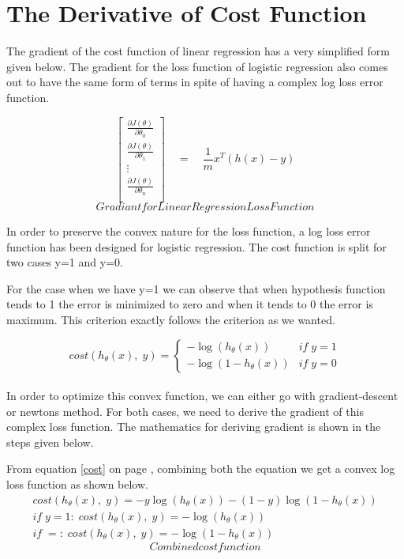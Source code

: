 \documentclass[10pt,a4paper]{article}
\begin{document}
\section{The Derivative of Cost Function}

The gradient of the cost function of linear regression has a very simplified form given below. The gradient for the loss function of logistic regression also comes out to have the same form of terms in spite of having a complex log loss error function.

$$
\begin{bmatrix} 
	\frac{\partial J(\theta)}{\partial\theta_0} \\
	\frac{\partial J(\theta)}{\partial\theta_1} \\
	\vdots \\
	\frac{\partial J(\theta)}{\partial\theta_n}\\
	\end{bmatrix}
	\quad 
	= \quad \frac{1}{m} x^T(h(x)-y)
$$
$$Gradiant for Linear Regression Loss Function$$ 


In order to preserve the convex nature for the loss function, a log loss error function has been designed for logistic regression. The cost function is split for two cases y=1 and y=0.

For the case when we have y=1 we can observe that when hypothesis function tends to 1 the error is minimized to zero and when it tends to 0 the error is maximum. This criterion exactly follows the criterion as we wanted.	
	
\begin{equation}
  cost(h_\theta(x),\; y) =
    \begin{cases}
      - \log(h_\theta(x)) & if \; y=1\\
      - \log(1 - h_\theta(x)) & if \; y=0
    \end{cases} 
  \label{cost}      
\end{equation}
\\
In order to optimize this convex function, we can either go with gradient-descent or newtons method. For both cases, we need to derive the gradient of this complex loss function. The mathematics for deriving gradient is shown in the steps given below.

From equation \eqref{cost} on page \pageref{cost}, combining both the equation we get a convex log loss function as shown below.
\begin{equation*}
\begin{array}{l}
	cost(h_\theta(x),\; y) = - y\log(h_\theta(x)) -(1-y) \log(1 - h_\theta(x))\\
	if \; y=1: \;   cost(h_\theta(x),\; y) = -\log(h_\theta(x))\\
	if \; =: \; cost(h_\theta(x),\; y) = -\log(1 - h_\theta(x))
\end{array}
\end{equation*}
$$Combined cost function$$
\end{document}
